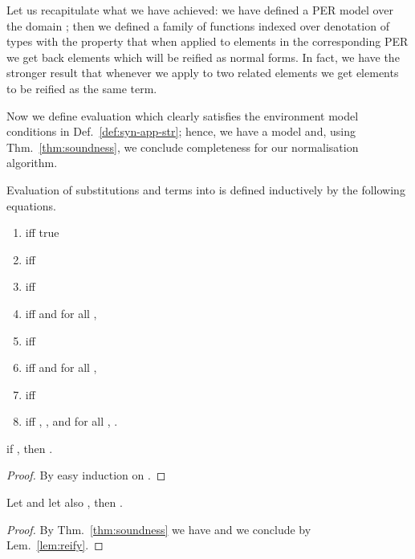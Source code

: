 \documentclass{LMCS}
\newcommand{\SHORTVERSION}[1]{#1}
\begin{document}
Let us recapitulate what we have achieved: we have defined a PER model
over the domain ; then we defined a family of functions 
indexed over denotation of types with the property that when applied
to elements in the corresponding PER we get back elements which will
be reified as normal forms. In fact, we have the stronger result that
whenever we apply  to two related elements 
we get elements to be reified as the same term.

Now we define evaluation which clearly satisfies the environment model
conditions in Def.~\ref{def:syn-app-str}; hence, we have a model and, using 
Thm.~\ref{thm:soundness}, we conclude completeness for our normalisation
algorithm.

\begin{defi}[Semantics] Evaluation of substitutions and terms
  into  is defined inductively by the following equations.
  
\end{defi}

\SHORTVERSION{
\begin{defi}[Validity] \hfill
  \begin{enumerate}[\em(1)]
  \item  iff true
  \item  iff 
  \item  iff 
  \item  iff  and for all , 
  \item  iff 
  \item  iff  and for all , 
  \item  iff 
  \item  iff ,
    , and for all ,
    .
  \end{enumerate}
\end{defi}
}

\SHORTVERSION{
\begin{thm}
  \label{thm:soundness}
  if , then .
\end{thm}
\begin{proof} By easy induction on . 
\end{proof}
}

\begin{thm}
  \label{thm:completeness}
  Let  and let also , then\linebreak
  .
\end{thm}
\begin{proof}
  By Thm.~\ref{thm:soundness} we have 
  and we conclude by Lem.~\ref{lem:reify}.
\end{proof}
\end{document}
